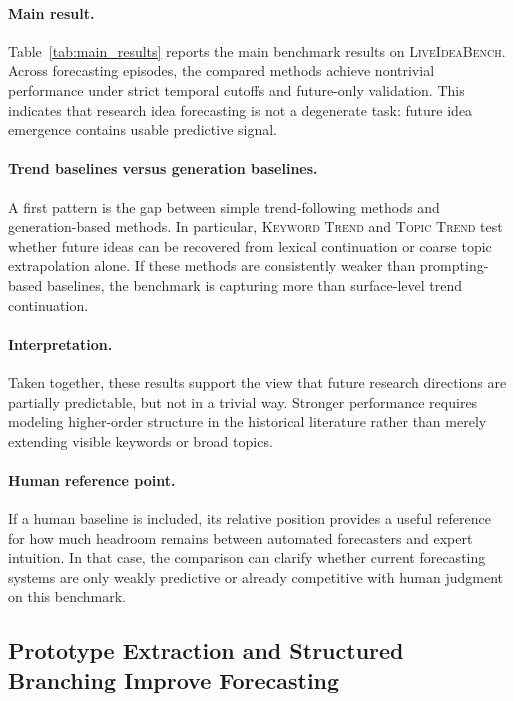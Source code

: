 \documentclass{article} %
\begin{document}
\paragraph{Main result.}
Table~\ref{tab:main_results} reports the main benchmark results on \textsc{LiveIdeaBench}. Across forecasting episodes, the compared methods achieve nontrivial performance under strict temporal cutoffs and future-only validation. This indicates that research idea forecasting is not a degenerate task: future idea emergence contains usable predictive signal.

\paragraph{Trend baselines versus generation baselines.}
A first pattern is the gap between simple trend-following methods and generation-based methods. In particular, \textsc{Keyword Trend} and \textsc{Topic Trend} test whether future ideas can be recovered from lexical continuation or coarse topic extrapolation alone. If these methods are consistently weaker than prompting-based baselines, the benchmark is capturing more than surface-level trend continuation.

\paragraph{Interpretation.}
Taken together, these results support the view that future research directions are partially predictable, but not in a trivial way. Stronger performance requires modeling higher-order structure in the historical literature rather than merely extending visible keywords or broad topics.

\paragraph{Human reference point.}
If a human baseline is included, its relative position provides a useful reference for how much headroom remains between automated forecasters and expert intuition. In that case, the comparison can clarify whether current forecasting systems are only weakly predictive or already competitive with human judgment on this benchmark.

\subsection{Prototype Extraction and Structured Branching Improve Forecasting}
\end{document}
